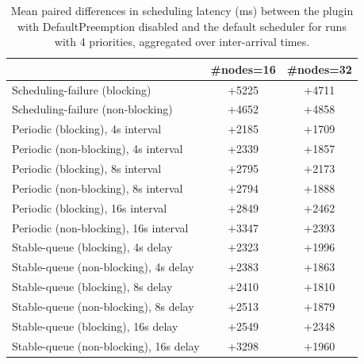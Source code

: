 \begin{table}[t]
\tiny
\setlength{\tabcolsep}{1.2pt}
\renewcommand{\arraystretch}{1.12}
\centering
\caption{Mean paired differences in scheduling latency (ms) between the plugin with DefaultPreemption disabled and the default scheduler for runs with 4 priorities, aggregated over inter-arrival times.}
\label{tab:latency-defpreempt0-prio4-std0-agg-arrival}
\begin{tabular}{l c c}
\toprule
 & \#nodes=16 & \#nodes=32 \\
\midrule
Scheduling-failure (blocking) & +5225 & +4711 \\
Scheduling-failure (non-blocking) & +4652 & +4858 \\
Periodic (blocking), 4s interval & +2185 & +1709 \\
Periodic (non-blocking), 4s interval & +2339 & +1857 \\
Periodic (blocking), 8s interval & +2795 & +2173 \\
Periodic (non-blocking), 8s interval & +2794 & +1888 \\
Periodic (blocking), 16s interval & +2849 & +2462 \\
Periodic (non-blocking), 16s interval & +3347 & +2393 \\
Stable-queue (blocking), 4s delay & +2323 & +1996 \\
Stable-queue (non-blocking), 4s delay & +2383 & +1863 \\
Stable-queue (blocking), 8s delay & +2410 & +1810 \\
Stable-queue (non-blocking), 8s delay & +2513 & +1879 \\
Stable-queue (blocking), 16s delay & +2549 & +2348 \\
Stable-queue (non-blocking), 16s delay & +3298 & +1960 \\
\bottomrule
\end{tabular}
\end{table}
